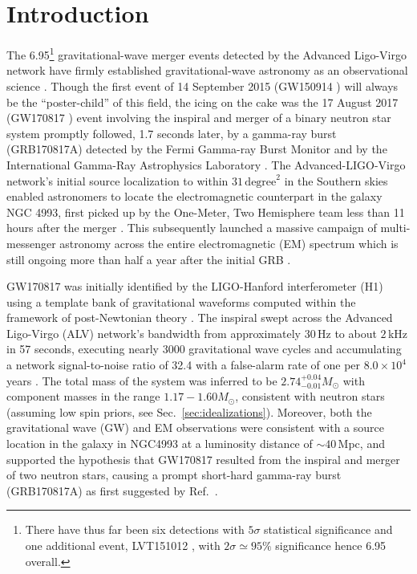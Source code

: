 \documentclass[prd,amsmath,amssymb,aps,floats,amsfonts,notitlepage,superscriptaddress,eqsecnum,nofootinbib,10pt]{revtex4-1}
\begin{document}
\section{Introduction}\label{Sec:Intro}
The 6.95\footnote{There have thus far been six detections with $5\sigma$ statistical significance and one additional event, LVT151012 \cite{TheLIGOScientific:2016pea}, with $2\sigma \simeq 95\%$ significance hence 6.95 overall.} 
gravitational-wave merger events detected by the Advanced Ligo-Virgo network have firmly established gravitational-wave astronomy
as an observational science \cite{TheLIGOScientific:2016pea, Abbott:2017gyy, Abbott:2017oio, Abbott:2017vtc, GW170817}. 
Though the first event of 14 September 2015 (GW150914 \cite{GW150914}) will always be the ``poster-child'' of this field,
the icing on the cake was the 17 August 2017 (GW170817 \cite{GW170817}) event involving the inspiral and merger of a binary neutron star system 
promptly followed, 1.7 seconds later, by a gamma-ray burst (GRB170817A) detected by the Fermi Gamma-ray Burst Monitor \cite{Fermi} and by the International Gamma-Ray Astrophysics Laboratory \cite{Svinkin, Savchenko:2017ffs}.
The Advanced-LIGO-Virgo network's initial source localization to within $ 31\,\text{degree}^2$ in the Southern skies
enabled astronomers to locate the electromagnetic counterpart in the galaxy NGC 4993, 
first picked up by the One-Meter, Two Hemisphere team less than 11 hours after the merger \cite{Coulter2017, Coulter:2017wya}.
This subsequently launched a massive campaign of multi-messenger astronomy across the entire electromagnetic (EM) spectrum which is still ongoing
more than half a year after the initial GRB \cite{GBM:2017lvd}. 

GW170817 was initially identified by the LIGO-Hanford interferometer (H1) 
using a template bank of gravitational waveforms computed within the framework of post-Newtonian theory \cite{Buonanno:2009zt, Blanchet_LRR}.
The inspiral swept across the Advanced Ligo-Virgo (ALV) network's bandwidth from approximately $ 30\,$Hz to about $ 2\,$kHz in 57 seconds,
executing nearly $ 3000$ gravitational wave cycles and accumulating a network signal-to-noise ratio of 32.4 with a false-alarm rate of one per $8.0\times 10^4$ years \cite{GW170817}. 
The total mass of the system was inferred to be $2.74^{+0.04}_{-0.01} M_\odot$ with component masses in the range $1.17-1.60 M_\odot$, consistent
with neutron stars (assuming low spin priors, see Sec.~\ref{sec:idealizations}).
Moreover, both the gravitational wave (GW) and EM observations were consistent with a source location in the galaxy in NGC4993 
at a luminosity distance of $\sim\!\! 40\,$Mpc,
and supported the hypothesis that GW170817 resulted from the inspiral and merger of two neutron stars, 
causing a prompt short-hard gamma-ray burst (GRB170817A) as first suggested by Ref.~\cite{Eichler:1989ve}. 
\end{document}
